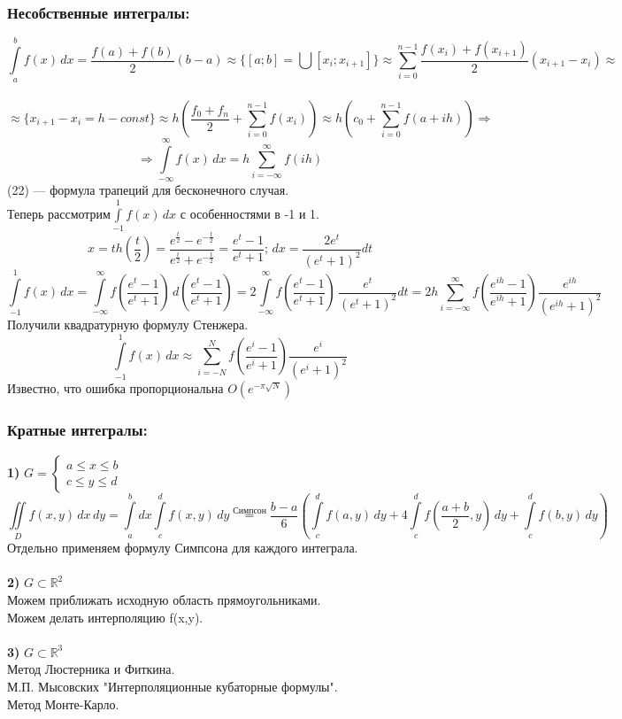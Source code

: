 \subsubsection{Несобственные интегралы:}
\[
\int\limits_{a}^{b} f(x) \, dx = \frac{f(a)+f(b)}{2}(b-a) \approx \{[a;b] = \bigcup[x_i;x_{i+1}]\} \approx \sum\limits_{i=0}^{n-1}\frac{f(x_i)+f(x_{i+1})}{2}(x_{i+1}-x_i) \approx
\]\\
\[
\approx \{x_{i+1}-x_i=h -const\} \approx h(\frac{f_0+f_n}{2} + \sum\limits_{i=0}^{n-1}f(x_i))\approx h(c_0 + \sum\limits_{i=0}^{n-1}f(a+ih)) \Rightarrow
\]
\begin{equation}
\Rightarrow \int\limits_{-\infty}^{\infty} f(x) \, dx = h\sum\limits_{i=-\infty}^{\infty}f(ih)
\end{equation}
(22) --- формула трапеций  для бесконечного случая.\\
Теперь рассмотрим$\int\limits_{-1}^{1} f(x) \, dx $ с особенностями в -1 и 1.\\
\[
x = th(\frac{t}{2}) = \frac{e^{\frac{t}{2}}-e^{-\frac{t}{2}}}{e^{\frac{t}{2}} + e^{-\frac{t}{2}}} = \frac{e^t-1}{e^t+1}; \,dx = \frac{2e^t}{(e^t+1)^2}dt
\]
\[
\int\limits_{-1}^{1} f(x) \, dx = \int\limits_{-\infty}^{\infty} f(\frac{e^t-1}{e^t+1}) \, d\left(\frac{e^t-1}{e^t+1}\right) = 2\int\limits_{-\infty}^{\infty} f(\frac{e^t-1}{e^t+1}) \, \frac{e^t}{(e^t+1)^2}dt = 2h \sum\limits_{i=-\infty}^{\infty}f(\frac{e^{ih}-1}{e^{ih}+1})\frac{e^{ih}}{(e^{ih}+1)^2}
\]
Получили квадратурную формулу Стенжера.\\
\[
\int\limits_{-1}^{1} f(x) \, dx  \approx \sum\limits_{i=-N}^{N}f(\frac{e^{i}-1}{e^{i}+1})\frac{e^{i}}{(e^{i}+1)^2}
\]
Известно, что ошибка пропорциональна $O(e^{-\pi\sqrt{N}})$
\subsubsection{Кратные интегралы:}
\textbf{1)}
$
G = \begin{cases}
a\leq x\leq b\\
c\leq y \leq d
\end{cases}
$
\[
\iint\limits_{D} f(x,y) \, dx \, dy = \int\limits_{a}^{b}dx\int\limits_{c}^{d}f(x,y)\,dy \overset{Симпсон}{=} \frac{b-a}{6}\left(\int\limits_{c}^{d}f(a,y)\,dy + 4\int\limits_{c}^{d}f(\frac{a+b}{2},y)\,dy + \int\limits_{c}^{d}f(b,y)\,dy\right)
\]
Отдельно применяем формулу Симпсона для каждого интеграла.\\
\\
\textbf{2)}
$G \subset 	\mathbb{R}^2$\\
Можем приближать исходную область прямоугольниками.\\
Можем делать интерполяцию f(x,y).\\
\\
\textbf{3)}
$G \subset 	\mathbb{R}^3$\\
Метод Люстерника и Фиткина.\\
М.П. Мысовских "Интерполяционные кубаторные формулы".\\
Метод Монте-Карло.
